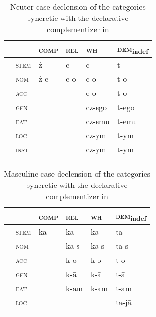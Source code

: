 \begin{table}
\caption{Neuter case declension of the categories syncretic with the declarative complementizer in }
\label{2D:Pol}
\begin{tabular}[h]{ l l l l l l }
 \lsptoprule
		& 			& \textsc{comp} & \textsc{rel} 	& \textsc{wh}  	& \textsc{dem}\textsubscript{indef}\\
\midrule	
 	& \textsc{stem}	& \.z-		 & c-\cellcolor[gray]{0.95}		& c-\cellcolor[gray]{0.95}	& t-\\
		& \textsc{nom}	&  \.z-e		 & c-o\cellcolor[gray]{0.85}	& c-o\cellcolor[gray]{0.85}	& t-o\\
 		& \textsc{acc}	&			 & 			& c-o\cellcolor[gray]{0.85}		& t-o\\
		& \textsc{gen}	&			 & 			& cz-ego		& t-ego\\	
		& \textsc{dat}	&			 & 			& cz-emu		& t-emu\\
		& \textsc{loc}	&			 & 			& cz-ym\cellcolor[gray]{0.75}	& t-ym\\
		& \textsc{inst}	&			 &			& cz-ym\cellcolor[gray]{0.75}	& t-ym\\
\lspbottomrule
\end{tabular}
\end{table}

\begin{table}
\caption{Masculine case declension of the categories syncretic with the declarative complementizer in }
\label{2D:Lat}
\begin{tabular}[h]{ l l l l l l }
 \lsptoprule
		& 			& \textsc{comp} & \textsc{rel} 	& \textsc{wh}  	& \textsc{dem}\textsubscript{indef}\\
\midrule	
	& \textsc{stem}	& ka\cellcolor[gray]{0.95}		& ka-\cellcolor[gray]{0.95}	& ka-\cellcolor[gray]{0.95}	& ta-\\
		& \textsc{nom}	& 			 & ka-s\cellcolor[gray]{0.90}	& ka-s\cellcolor[gray]{0.90}	& ta-s\\
 		& \textsc{acc}	&			 & k-o\cellcolor[gray]{0.80}	& k-o\cellcolor[gray]{0.80}		& t-o\\
		& \textsc{gen}	&	& k-\={a}\cellcolor[gray]{0.75}& k-\={a}\cellcolor[gray]{0.75} 
																	& t-\={a}\\	
		& \textsc{dat}	&			 & k-am\cellcolor[gray]{0.7}	& k-am\cellcolor[gray]{0.7}	& t-am\\
		& \textsc{loc}	&			 & 						& 		& ta-j\={a}\\
\lspbottomrule
\end{tabular}
\end{table}

